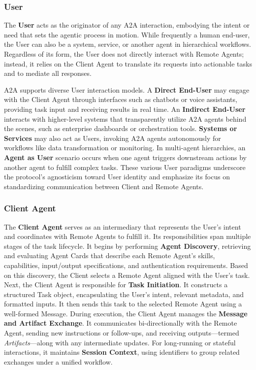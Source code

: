 \documentclass{article}
\begin{document}
\subsubsection{User}
The \textbf{User} acts as the originator of any A2A interaction, embodying the intent or need that sets the agentic process in motion. While frequently a human end-user, the User can also be a system, service, or another agent in hierarchical workflows. Regardless of its form, the User does not directly interact with Remote Agents; instead, it relies on the Client Agent to translate its requests into actionable tasks and to mediate all responses.

A2A supports diverse User interaction models. A \textbf{Direct End-User} may engage with the Client Agent through interfaces such as chatbots or voice assistants, providing task input and receiving results in real time. An \textbf{Indirect End-User} interacts with higher-level systems that transparently utilize A2A agents behind the scenes, such as enterprise dashboards or orchestration tools. \textbf{Systems or Services} may also act as Users, invoking A2A agents autonomously for workflows like data transformation or monitoring. In multi-agent hierarchies, an \textbf{Agent as User} scenario occurs when one agent triggers downstream actions by another agent to fulfill complex tasks. These various User paradigms underscore the protocol’s agnosticism toward User identity and emphasize its focus on standardizing communication between Client and Remote Agents.

\subsubsection{Client Agent}
The \textbf{Client Agent} serves as an intermediary that represents the User's intent and coordinates with Remote Agents to fulfill it. Its responsibilities span multiple stages of the task lifecycle. It begins by performing \textbf{Agent Discovery}, retrieving and evaluating Agent Cards that describe each Remote Agent’s skills, capabilities, input/output specifications, and authentication requirements. Based on this discovery, the Client selects a Remote Agent aligned with the User’s task. Next, the Client Agent is responsible for \textbf{Task Initiation}. It constructs a structured Task object, encapsulating the User's intent, relevant metadata, and formatted inputs. It then sends this task to the selected Remote Agent using a well-formed Message. During execution, the Client Agent manages the \textbf{Message and Artifact Exchange}. It communicates bi-directionally with the Remote Agent, sending new instructions or follow-ups, and receiving outputs—termed \textit{Artifacts}—along with any intermediate updates. For long-running or stateful interactions, it maintains \textbf{Session Context}, using identifiers to group related exchanges under a unified workflow.
\end{document}
